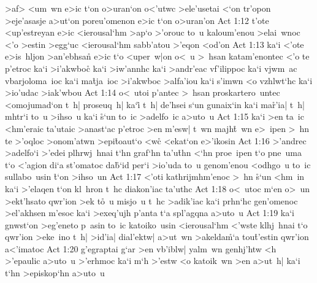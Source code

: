 >af>
<um~wn
e>ic
t`on
o>uran`on
o<'utwc
>ele'usetai
<`on
tr'opon
>eje'asasje
a>ut`on
poreu'omenon
e>ic
t`on
o>uran'on\bibvsend
\vs Act 1:12
t'ote
<up'estreyan
e>ic
<ierousal`hm
>ap`o
>'orouc
to~u
kaloum'enou
>elai~wnoc
<'o
>estin
>egg`uc
<ierousal`hm
sabb'atou
>'eqon
<od'on\bibvsend
\vs Act 1:13
ka`i
<'ote
e>is~hljon
>an'ebhsan\r{}
e>ic
t`o
<uper~w|on
o<~u
>~hsan
katam'enontec
<'o
te
p'etroc
ka`i
>i'akwboc\r{}
ka`i
>iw'annhc
ka`i
>andr'eac
vf'ilippoc
ka`i
vjwm~ac
vbarjoloma~ioc
ka`i
ma\r{t}ja~ioc
>i'akwboc
>alfa'iou
ka`i
s'imwn
<o
vzhlwt`hc
ka`i
>io'udac
>iak'wbou\bibvsend
\vs Act 1:14
o<~utoi
p'antec
>~hsan
proskartero~untec
<omojumad`on
t~h|
proseuq~h|
ka`i\r{}
t~h|
de'hsei
s`un
gunaix`in
ka`i
ma\r{r}'ia|
t~h|
mhtr`i
to~u
>ihso~u
ka`i
\r{s}`un
to~ic
>adelfo~ic
a>uto~u\bibvsend
\vs Act 1:15
ka`i
>en
ta~ic
<hm'eraic
ta'utaic
>anast`ac
p'etroc
>en
m'esw|
t~wn
majh\r{t}~wn
e>~ipen
>~hn
te
>'oqloc
>onom'atwn
>epi\r{t}oaut`o
<w\r{c}
<ekat`on
e>'ikosin\bibvsend
\vs Act 1:16
>'andrec
>adelfo`i
>'edei
plhrwj~hnai
t`hn
graf`hn
ta'u\r{t}hn
<`hn
proe~ipen
t`o
pne~uma
t`o
<'agion
di`a
st'omatoc
da\r{b}`id
per`i
>io'uda
to~u
genom'enou
<odhgo~u
to~ic
sullabo~usin
\r{t}`on
>ihso~un\bibvsend
\vs Act 1:17
<'oti
kathrijmhm'enoc
>~hn
\r{s}`un
<hm~in
ka`i
>'elaqen
t`on
kl~hron
t~hc
diakon'iac
ta'uthc\bibvsend
\vs Act 1:18
o<~utoc
m`en
o>~un
>ekt'hsato
qwr'ion
>ek
t\r{o}~u
misjo~u
t~hc
>adik'iac
ka`i
prhn`hc
gen'omenoc
>el'akhsen
m'esoc
ka`i
>exeq'ujh
p'anta
t`a
spl'agqna
a>uto~u\bibvsend
\vs Act 1:19
ka`i
gnwst`on
>eg'eneto
p~asin
to~ic
katoiko~usin
<ierousal`hm
<'wste
klhj~hnai
t`o
qwr'ion
>eke~ino
t~h|
>id'ia|
dial'ektw|
a>ut~wn
>akelda\r{m}`a
tou\r{t}'estin
qwr'ion
a<'imatoc\bibvsend
\vs Act 1:20
g'egraptai
g`ar
>en
vb'iblw|
yalm~wn
genhj'htw
<h
>'epaulic
a>uto~u
>'erhmoc
ka`i
m`h
>'estw
<o
katoik~wn
>en
a>ut~h|
ka`i
t`hn
>episkop`hn
a>uto~u
